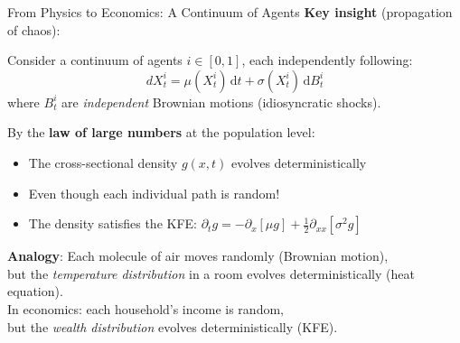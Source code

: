 \documentclass[aspectratio=169,11pt]{beamer}
\newcommand{\emphc}[1]{\textcolor{harvardcrimson}{#1}}
\newcommand{\ud}{\,\mathrm{d}}
\begin{document}
\begin{frame}{From Physics to Economics: A Continuum of Agents}
\small
\textbf{Key insight} (propagation of chaos):

\vspace{0.1em}
Consider a \emphc{continuum} of agents $i \in [0,1]$, each independently following:
\[
dX_t^i = \mu(X_t^i)\ud t + \sigma(X_t^i)\ud B_t^i
\]
where $B_t^i$ are \emph{independent} Brownian motions (idiosyncratic shocks).

\vspace{0.2em}
By the \textbf{law of large numbers} at the population level:
\begin{itemize}\itemsep2pt
    \item The \emphc{cross-sectional density} $g(x,t)$ evolves \emphc{deterministically}
    \item Even though each individual path is random!
    \item The density satisfies the \emphc{KFE}: $\partial_t g = -\partial_x[\mu g] + \frac{1}{2}\partial_{xx}[\sigma^2 g]$
\end{itemize}

\vspace{0.2em}
\begin{center}
\colorbox{uzhgreylight}{\parbox{0.85\textwidth}{\centering
\textbf{Analogy}: Each molecule of air moves randomly (Brownian motion),\\
but the \emph{temperature distribution} in a room evolves deterministically (heat equation).\\[3pt]
In economics: each household's income is random,\\
but the \emph{wealth distribution} evolves deterministically (KFE).
}}
\end{center}
\end{frame}
\end{document}
